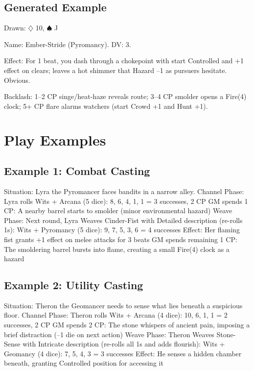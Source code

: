 \subsection{Generated Example}
Drawn: $\diamondsuit$ 10, $\spadesuit$ J

Name: Ember-Stride (Pyromancy). DV: 3.

Effect: For 1 beat, you dash through a chokepoint with start Controlled and +1 effect on clears; leaves a hot shimmer that Hazard --1 as pursuers hesitate. Obvious.

Backlash: 1--2 CP singe/heat-haze reveals route; 3--4 CP smolder opens a Fire(4) clock; 5+ CP flare alarms watchers (start Crowd +1 and Hunt +1).

\section{Play Examples}

\subsection{Example 1: Combat Casting}
Situation: Lyra the Pyromancer faces bandits in a narrow alley.
Channel Phase: Lyra rolls Wits + Arcana (5 dice): 8, 6, 4, 1, 1 = 3 successes, 2 CP
GM spends 1 CP: A nearby barrel starts to smolder (minor environmental hazard)
Weave Phase: Next round, Lyra Weaves Cinder-Fist with Detailed description (re-rolls 1s):
Wits + Pyromancy (5 dice): 9, 7, 5, 3, 6 = 4 successes
Effect: Her flaming fist grants +1 effect on melee attacks for 3 beats
GM spends remaining 1 CP: The smoldering barrel bursts into flame, creating a small Fire(4) clock as a hazard

\subsection{Example 2: Utility Casting}
Situation: Theron the Geomancer needs to sense what lies beneath a suspicious floor.
Channel Phase: Theron rolls Wits + Arcana (4 dice): 10, 6, 1, 1 = 2 successes, 2 CP
GM spends 2 CP: The stone whispers of ancient pain, imposing a brief distraction (–1 die on next action)
Weave Phase: Theron Weaves Stone-Sense with Intricate description (re-rolls all 1s and adds flourish): Wits + Geomancy (4 dice): 7, 5, 4, 3 = 3 successes
Effect: He senses a hidden chamber beneath, granting Controlled position for accessing it

